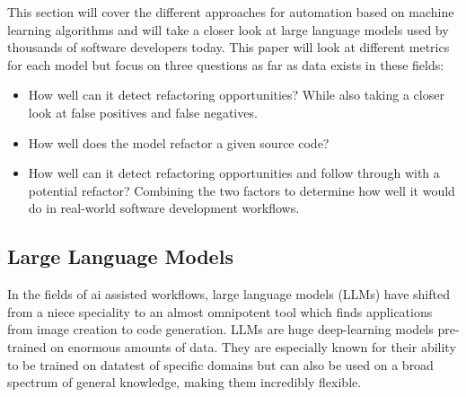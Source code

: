 This section will cover the different approaches for automation based on machine learning algorithms and will take a closer look at large language models used by thousands of software developers today. This paper will look at different metrics for each model but focus on three questions as far as data exists in these fields:
\begin{itemize}
    \item How well can it detect refactoring opportunities? While also taking a closer look at false positives and false negatives.
    \item How well does the model refactor a given source code? 
    \item How well can it detect refactoring opportunities and follow through with a potential refactor? Combining the two factors to determine how well it would do in real-world software development workflows.
\end{itemize}
\subsection{Large Language Models}
In the fields of ai assisted workflows, large language models (LLMs) have shifted from a niece speciality to an almost omnipotent tool which finds applications from image creation to code generation.\cite{meyer2024ai} LLMs are huge deep-learning models pre-trained on enormous amounts of data. They are especially known for their ability to be trained on datatest of specific domains but can also be used on a broad spectrum of general knowledge, making them incredibly flexible. \cite{baumgartner2024aidriven}
